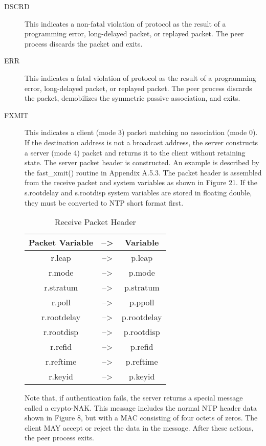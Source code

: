 \begin{description}

  \item[DSCRD] This indicates a non-fatal violation of protocol as the
    result of a programming error, long-delayed packet, or replayed
    packet. The peer process discards the packet and exits.

  \item[ERR] This indicates a fatal violation of protocol as the result of a
    programming error, long-delayed packet, or replayed packet. The peer
    process discards the packet, demobilizes the symmetric passive
    association, and exits.

  \item[FXMIT] This indicates a client (mode 3) packet matching no
    association (mode 0). If the destination address is not a broadcast
    address, the server constructs a server (mode 4) packet and returns
    it to the client without retaining state. The server packet header
    is constructed. An example is described by the fast\_xmit() routine
    in Appendix A.5.3. The packet header is assembled from the receive
    packet and system variables as shown in Figure 21. If the
    s.rootdelay and s.rootdisp system variables are stored in floating
    double, they must be converted to NTP short format first.

    \begin{table}[htb]
    \center
    \begin{tabular}{c | c | c}
    Packet Variable & --> & Variable \\
    \hline
    \hline
    r.leap & --> & p.leap \\
    r.mode & --> & p.mode \\
    r.stratum & --> & p.stratum \\
    r.poll & --> & p.ppoll \\
    r.rootdelay & --> & p.rootdelay \\
    r.rootdisp & --> & p.rootdisp \\
    r.refid & --> & p.refid \\
    r.reftime & --> & p.reftime \\
    r.keyid & --> & p.keyid \\
    \hline
    \end{tabular}
    \label{receive_packet_header}
    \caption{Receive Packet Header}
    \end{table}

    Note that, if authentication fails, the server returns a special
    message called a crypto-NAK. This message includes the normal NTP
    header data shown in Figure 8, but with a MAC consisting of four
    octets of zeros. The client MAY accept or reject the data in the
    message. After these actions, the peer process exits.


\end{description}
